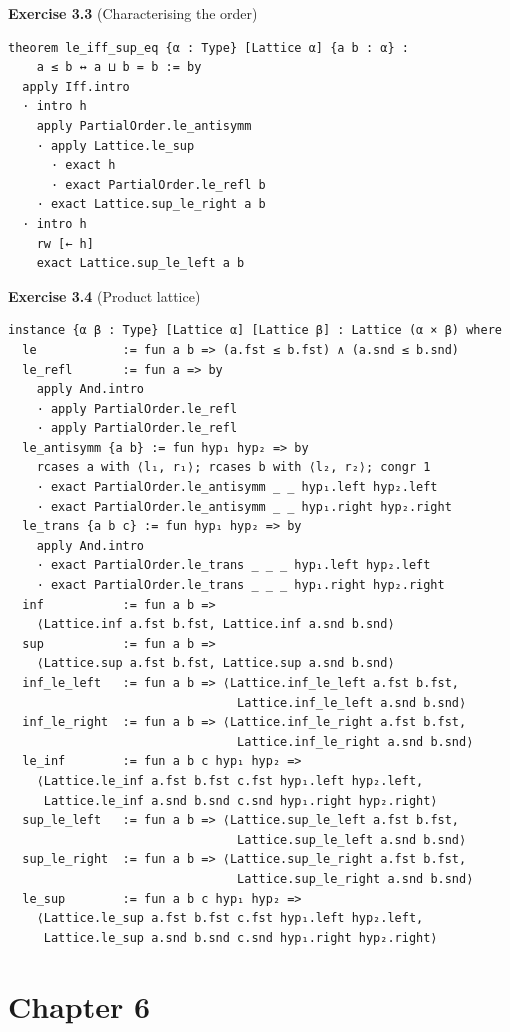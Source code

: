 \documentclass[12pt, a4paper, openright]{book}
\theoremstyle{thmstyle}
\theoremstyle{defstyle}
\begin{document}
\textbf{Exercise 3.3} (Characterising the order)

\begin{verbatim}
theorem le_iff_sup_eq {α : Type} [Lattice α] {a b : α} :
    a ≤ b ↔ a ⊔ b = b := by
  apply Iff.intro
  · intro h
    apply PartialOrder.le_antisymm
    · apply Lattice.le_sup
      · exact h
      · exact PartialOrder.le_refl b
    · exact Lattice.sup_le_right a b
  · intro h
    rw [← h]
    exact Lattice.sup_le_left a b
\end{verbatim}

\textbf{Exercise 3.4} (Product lattice)

\begin{verbatim}
instance {α β : Type} [Lattice α] [Lattice β] : Lattice (α × β) where
  le            := fun a b => (a.fst ≤ b.fst) ∧ (a.snd ≤ b.snd)
  le_refl       := fun a => by
    apply And.intro
    · apply PartialOrder.le_refl
    · apply PartialOrder.le_refl
  le_antisymm {a b} := fun hyp₁ hyp₂ => by
    rcases a with ⟨l₁, r₁⟩; rcases b with ⟨l₂, r₂⟩; congr 1
    · exact PartialOrder.le_antisymm _ _ hyp₁.left hyp₂.left
    · exact PartialOrder.le_antisymm _ _ hyp₁.right hyp₂.right
  le_trans {a b c} := fun hyp₁ hyp₂ => by
    apply And.intro
    · exact PartialOrder.le_trans _ _ _ hyp₁.left hyp₂.left
    · exact PartialOrder.le_trans _ _ _ hyp₁.right hyp₂.right
  inf           := fun a b =>
    ⟨Lattice.inf a.fst b.fst, Lattice.inf a.snd b.snd⟩
  sup           := fun a b =>
    ⟨Lattice.sup a.fst b.fst, Lattice.sup a.snd b.snd⟩
  inf_le_left   := fun a b => ⟨Lattice.inf_le_left a.fst b.fst,
                                Lattice.inf_le_left a.snd b.snd⟩
  inf_le_right  := fun a b => ⟨Lattice.inf_le_right a.fst b.fst,
                                Lattice.inf_le_right a.snd b.snd⟩
  le_inf        := fun a b c hyp₁ hyp₂ =>
    ⟨Lattice.le_inf a.fst b.fst c.fst hyp₁.left hyp₂.left,
     Lattice.le_inf a.snd b.snd c.snd hyp₁.right hyp₂.right⟩
  sup_le_left   := fun a b => ⟨Lattice.sup_le_left a.fst b.fst,
                                Lattice.sup_le_left a.snd b.snd⟩
  sup_le_right  := fun a b => ⟨Lattice.sup_le_right a.fst b.fst,
                                Lattice.sup_le_right a.snd b.snd⟩
  le_sup        := fun a b c hyp₁ hyp₂ =>
    ⟨Lattice.le_sup a.fst b.fst c.fst hyp₁.left hyp₂.left,
     Lattice.le_sup a.snd b.snd c.snd hyp₁.right hyp₂.right⟩
\end{verbatim}

\section*{Chapter 6}
\end{document}
